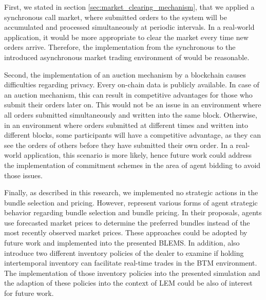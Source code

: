 First, we stated in section \ref{sec:market_clearing_mechanism}, that we
applied a synchronous call market, where submitted orders to the system
will be accumulated and processed simultaneously at periodic intervals.
In a real-world application, it would be more appropriate to clear the market every time new orders arrive. Therefore,
the implementation from the synchronous to the introduced asynchronous market trading environment of  would be reasonable. 

Second, the implementation of an auction mechanism by a blockchain causes 
difficulties regarding privacy. Every on-chain data is publicly available. 
In case of an auction mechanism, this can result in competitive advantages
for those who submit their orders later on. 
This would not be an issue in an environment where all orders submitted simultaneously and written into the same block.
Otherwise, in an environment where orders submitted at different times and written into different blocks,
some participants will have a competitive advantage, as they can see the orders 
of others before they have submitted their own order.
In a real-world application, this scenario is more likely, hence
future work could address the implementation of commitment schemes
in the area of agent bidding to avoid those issues.

Finally, as described in this research, we implemented no strategic
actions in the bundle selection and pricing. 
However,  represent various 
forms of agent strategic behavior regarding bundle selection 
and bundle pricing.
In their proposals, agents use forecasted market prices to determine the preferred bundles
instead of the most recently observed market prices. 
These approaches could be adopted by future work and implemented
into the presented BLEMS.
In addition,  also introduce two
different inventory policies of the dealer to examine if holding intertemporal inventory can 
facilitate real-time trades in the BTM environment. The implementation of those inventory policies
into the presented simulation and the adaption of these policies
into the context of LEM could be also of interest for future work. 








\begin{comment}

\end{comment}
